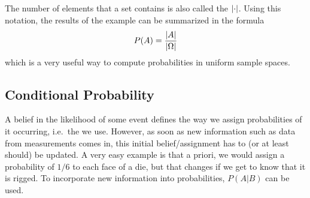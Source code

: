 The number of elements that a set contains is also called the  $\abs{\cdot}$. Using this notation, the results of the example can be summarized in the formula
\begin{equation}
P(A) = \frac{\abs{A}}{\abs{\Omega}}
\end{equation}
which is a very useful way to compute probabilities in uniform sample spaces.



	\subsection{Conditional Probability}
A belief in the likelihood of some event defines the way we assign probabilities of it occurring, i.e.~the  we use. However, as soon as new information such as data from measurements comes in, this initial belief/assignment has to (or at least should) be updated. A very easy example is that a priori, we would assign a probability of $1 / 6$ to each face of a die, but that changes if we get to know that it is rigged. To incorporate new information into probabilities,  $P(A | B)$ can be used.


